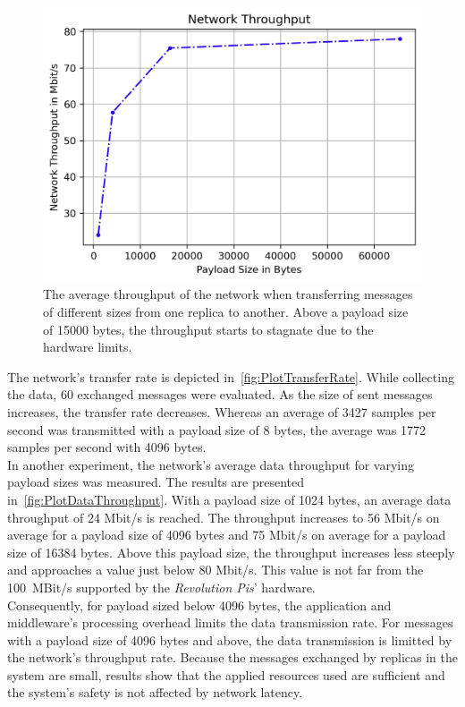 \begin{figure}[!htb]
	\centering
	\includegraphics[width=0.8\linewidth]{images/plots/dataThroughput}
	\caption{The average throughput of the network when transferring messages of different sizes from one replica to another. Above a payload size of 15000 bytes, the throughput starts to stagnate due to the  hardware limits.}
	\label{fig:PlotDataThroughput}
\end{figure}

The network's transfer rate is depicted in~\autoref{fig:PlotTransferRate}.
While collecting the data, 60 exchanged messages were evaluated.
As the size of sent messages increases, the transfer rate decreases.
Whereas an average of 3427 samples per second was transmitted with a payload size of 8 bytes, the average was 1772 samples per second with 4096 bytes.
\\

In another experiment, the network's average data throughput for varying payload sizes was measured.
The results are presented in~\autoref{fig:PlotDataThroughput}.
With a payload size of 1024 bytes, an average data throughput of 24 Mbit/s is reached.
The throughput increases to 56 Mbit/s on average for a payload size of 4096 bytes and 75 Mbit/s on average for a payload size of 16384 bytes.
Above this payload size, the throughput increases less steeply and approaches a value just below 80 Mbit/s.
This value is not far from the 100~MBit/s supported by the \textit{Revolution Pis}' hardware.
\\

Consequently, for payload sized below 4096 bytes, the application and middleware's processing overhead limits the data transmission rate.
For messages with a payload size of 4096 bytes and above, the data transmission is limitted by the network's throughput rate.
Because the messages exchanged by replicas in the system are small, results show that the applied resources used are sufficient and the system's safety is not affected by network latency.
\\

